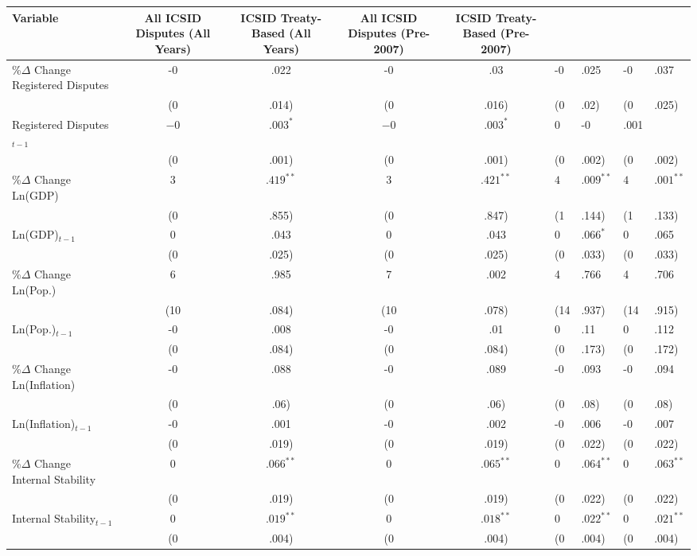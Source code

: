 \begin{table}[ht]
\centering
{\footnotesize
\begin{tabular}{lcccc}
 Variable & All ICSID Disputes (All Years) & ICSID Treaty-Based (All Years) & All ICSID Disputes (Pre-2007) & ICSID Treaty-Based (Pre-2007) \\ 
  \hline
\hline
\%$\Delta$ Change Registered Disputes & -0&.022 & -0&.03 & -0&.025 & -0&.037 \\ 
   & (0&.014) & (0&.016) & (0&.02) & (0&.025) \\ 
  Registered Disputes$_{t-1}$ & $-0$&$.003^{\ast}$ & $-0$&$.003^{\ast}$ & 0 & -0&.001 \\ 
   & (0&.001) & (0&.001) & (0&.002) & (0&.002) \\ 
  \%$\Delta$ Change Ln(GDP) & $3$&$.419^{\ast\ast}$ & $3$&$.421^{\ast\ast}$ & $4$&$.009^{\ast\ast}$ & $4$&$.001^{\ast\ast}$ \\ 
   & (0&.855) & (0&.847) & (1&.144) & (1&.133) \\ 
  Ln(GDP)$_{t-1}$ & 0&.043 & 0&.043 & $0$&$.066^{\ast}$ & 0&.065 \\ 
   & (0&.025) & (0&.025) & (0&.033) & (0&.033) \\ 
  \%$\Delta$ Change Ln(Pop.) & 6&.985 & 7&.002 & 4&.766 & 4&.706 \\ 
   & (10&.084) & (10&.078) & (14&.937) & (14&.915) \\ 
  Ln(Pop.)$_{t-1}$ & -0&.008 & -0&.01 & 0&.11 & 0&.112 \\ 
   & (0&.084) & (0&.084) & (0&.173) & (0&.172) \\ 
  \%$\Delta$ Change Ln(Inflation) & -0&.088 & -0&.089 & -0&.093 & -0&.094 \\ 
   & (0&.06) & (0&.06) & (0&.08) & (0&.08) \\ 
  Ln(Inflation)$_{t-1}$ & -0&.001 & -0&.002 & -0&.006 & -0&.007 \\ 
   & (0&.019) & (0&.019) & (0&.022) & (0&.022) \\ 
  \%$\Delta$ Change Internal Stability & $0$&$.066^{\ast\ast}$ & $0$&$.065^{\ast\ast}$ & $0$&$.064^{\ast\ast}$ & $0$&$.063^{\ast\ast}$ \\ 
   & (0&.019) & (0&.019) & (0&.022) & (0&.022) \\ 
  Internal Stability$_{t-1}$ & $0$&$.019^{\ast\ast}$ & $0$&$.018^{\ast\ast}$ & $0$&$.022^{\ast\ast}$ & $0$&$.021^{\ast\ast}$ \\ 
   & (0&.004) & (0&.004) & (0&.004) & (0&.004) \\ 

\end{tabular}}
\end{table}
